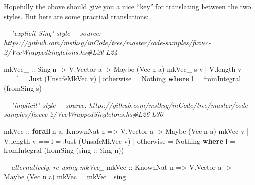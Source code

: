 \documentclass[]{article}
\newenvironment{Shaded}{}{}
\newcommand{\CommentTok}[1]{\textcolor[rgb]{0.38,0.63,0.69}{\textit{#1}}}
\newcommand{\DataTypeTok}[1]{\textcolor[rgb]{0.56,0.13,0.00}{#1}}
\newcommand{\FunctionTok}[1]{\textcolor[rgb]{0.02,0.16,0.49}{#1}}
\newcommand{\KeywordTok}[1]{\textcolor[rgb]{0.00,0.44,0.13}{\textbf{#1}}}
\newcommand{\NormalTok}[1]{#1}
\newcommand{\OperatorTok}[1]{\textcolor[rgb]{0.40,0.40,0.40}{#1}}
\newcommand{\OtherTok}[1]{\textcolor[rgb]{0.00,0.44,0.13}{#1}}
\begin{document}
Hopefully the above should give you a nice ``key'' for translating between the
two styles. But here are some practical translations:

\begin{Shaded}
\begin{Highlighting}[]
\CommentTok{{-}{-} "explicit Sing" style}
\CommentTok{{-}{-} source: https://github.com/mstksg/inCode/tree/master/code{-}samples/fixvec{-}2/VecWrappedSingletons.hs\#L20{-}L24}

\OtherTok{mkVec\_ ::} \DataTypeTok{Sing}\NormalTok{ n }\OtherTok{{-}\textgreater{}} \DataTypeTok{V.Vector}\NormalTok{ a }\OtherTok{{-}\textgreater{}} \DataTypeTok{Maybe}\NormalTok{ (}\DataTypeTok{Vec}\NormalTok{ n a)}
\NormalTok{mkVec\_ s v }\OperatorTok{|}\NormalTok{ V.length v }\OperatorTok{==}\NormalTok{ l }\OtherTok{=} \DataTypeTok{Just}\NormalTok{ (}\DataTypeTok{UnsafeMkVec}\NormalTok{ v)}
           \OperatorTok{|} \FunctionTok{otherwise}       \OtherTok{=} \DataTypeTok{Nothing}
  \KeywordTok{where}
\NormalTok{    l }\OtherTok{=} \FunctionTok{fromIntegral}\NormalTok{ (fromSing s)}

\CommentTok{{-}{-} "implicit" style}
\CommentTok{{-}{-} source: https://github.com/mstksg/inCode/tree/master/code{-}samples/fixvec{-}2/VecWrappedSingletons.hs\#L26{-}L30}

\OtherTok{mkVec ::} \KeywordTok{forall}\NormalTok{ n a}\OperatorTok{.} \DataTypeTok{KnownNat}\NormalTok{ n }\OtherTok{=\textgreater{}} \DataTypeTok{V.Vector}\NormalTok{ a }\OtherTok{{-}\textgreater{}} \DataTypeTok{Maybe}\NormalTok{ (}\DataTypeTok{Vec}\NormalTok{ n a)}
\NormalTok{mkVec v }\OperatorTok{|}\NormalTok{ V.length v }\OperatorTok{==}\NormalTok{ l }\OtherTok{=} \DataTypeTok{Just}\NormalTok{ (}\DataTypeTok{UnsafeMkVec}\NormalTok{ v)}
        \OperatorTok{|} \FunctionTok{otherwise}       \OtherTok{=} \DataTypeTok{Nothing}
  \KeywordTok{where}
\NormalTok{    l }\OtherTok{=} \FunctionTok{fromIntegral}\NormalTok{ (fromSing (}\OtherTok{sing ::} \DataTypeTok{Sing}\NormalTok{ n))}

\CommentTok{{-}{-} alternatively, re{-}using \textasciigrave{}mkVec\_\textasciigrave{}}
\OtherTok{mkVec ::} \DataTypeTok{KnownNat}\NormalTok{ n }\OtherTok{=\textgreater{}} \DataTypeTok{V.Vector}\NormalTok{ a }\OtherTok{{-}\textgreater{}} \DataTypeTok{Maybe}\NormalTok{ (}\DataTypeTok{Vec}\NormalTok{ n a)}
\NormalTok{mkVec }\OtherTok{=}\NormalTok{ mkVec\_ sing}
\end{Highlighting}
\end{Shaded}
\end{document}
